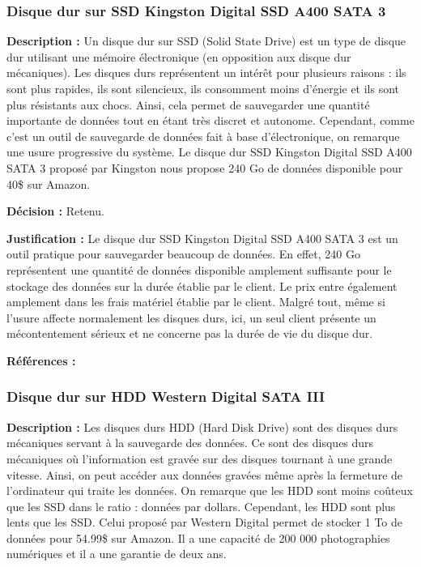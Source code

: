 \subsubsection{Disque dur sur SSD Kingston Digital SSD A400 SATA 3 }
\textbf{Description :} Un disque dur sur SSD (Solid State Drive) est un type de disque dur utilisant une mémoire électronique (en opposition aux disque dur mécaniques). Les disques durs représentent un intérêt pour plusieurs raisons : ils sont plus rapides, ils sont silencieux, ils consomment moins d’énergie et ils sont plus résistants aux chocs. Ainsi, cela permet de sauvegarder une quantité importante de données tout en étant très discret et autonome. Cependant, comme c’est un outil de sauvegarde de données fait à base d’électronique, on remarque une usure progressive du système. Le disque dur SSD Kingston Digital SSD A400 SATA 3 proposé par Kingston nous propose 240 Go de données disponible pour 40\$ sur Amazon. 

\textbf{Décision :} Retenu.

\textbf{Justification :} Le disque dur SSD Kingston Digital SSD A400 SATA 3 est un outil pratique pour sauvegarder beaucoup de données. En effet, 240 Go représentent une quantité de données disponible amplement suffisante pour le stockage des données sur la durée établie par le client. Le prix entre également amplement dans les frais matériel établie par le client. Malgré tout, même si l’usure affecte normalement les disques durs, ici, un seul client présente un mécontentement sérieux et ne concerne pas la durée de vie du disque dur.

\textbf{Références :} \cite{AMSSD} \cite{DESSD}

\subsubsection{Disque dur sur HDD Western Digital SATA III }

\textbf{Description :} Les disques durs HDD (Hard Disk Drive) sont des disques durs mécaniques servant à la sauvegarde des données. Ce sont des disques durs mécaniques où l’information est gravée sur des disques tournant à une grande vitesse. Ainsi, on peut accéder aux données gravées même après la fermeture de l’ordinateur qui traite les données. On remarque que les HDD sont moins coûteux que les SSD dans le ratio : données par dollars. Cependant, les HDD sont plus lents que les SSD. Celui proposé par Western Digital permet de stocker 1 To de données pour 54.99\$ sur Amazon. Il a une capacité de 200 000 photographies numériques et il a une garantie de deux ans. 


